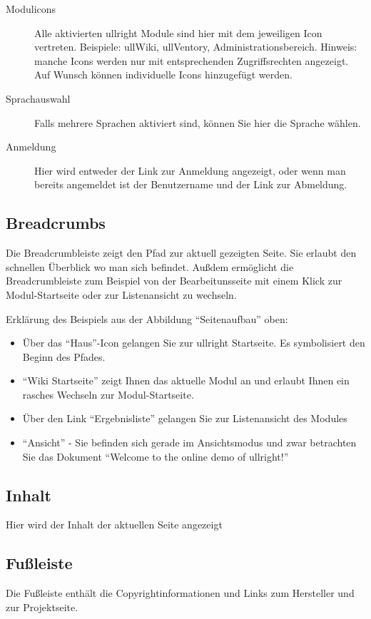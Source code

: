 \documentclass[article, a4paper, oneside, 11pt]{memoir}
\begin{document}
\begin{description}
\item[Modulicons] Alle aktivierten ullright Module sind hier mit dem jeweiligen Icon vertreten. Beispiele: ullWiki, ullVentory, Administrationsbereich. Hinweis: manche Icons werden nur mit entsprechenden Zugriffsrechten angezeigt. Auf Wunsch können individuelle Icons hinzugefügt werden.
\item[Sprachauswahl] Falls mehrere Sprachen aktiviert sind, können Sie hier die Sprache wählen.
\item[Anmeldung] Hier wird entweder der Link zur Anmeldung angezeigt, oder wenn man bereits angemeldet ist der Benutzername und der Link zur Abmeldung.
\end{description}
\subsection{Breadcrumbs}
Die Breadcrumbleiste zeigt den Pfad zur aktuell gezeigten Seite. Sie erlaubt den schnellen Überblick wo man sich befindet. Außdem ermöglicht die Breadcrumbleiste zum Beispiel von der Bearbeitunsseite mit einem Klick zur Modul-Startseite oder zur Listenansicht zu wechseln.

Erklärung des Beispiels aus der Abbildung "`Seitenaufbau"' oben:

\begin{itemize}
\item Über das "`Haus"'-Icon gelangen Sie zur ullright Startseite. Es symbolisiert den Beginn des Pfades.
\item "`Wiki Startseite"' zeigt Ihnen das aktuelle Modul an und erlaubt Ihnen ein rasches Wechseln zur Modul-Startseite.
\item Über den Link "`Ergebnisliste"' gelangen Sie zur Listenansicht des Modules
\item "`Ansicht"' - Sie befinden sich gerade im Ansichtsmodus und zwar betrachten Sie das Dokument "`Welcome to the online demo of ullright!"'
\end{itemize}
\subsection{Inhalt}
Hier wird der Inhalt der aktuellen Seite angezeigt

\subsection{Fußleiste}
Die Fußleiste enthält die Copyrightinformationen und Links zum Hersteller und zur Projektseite.
\end{document}
